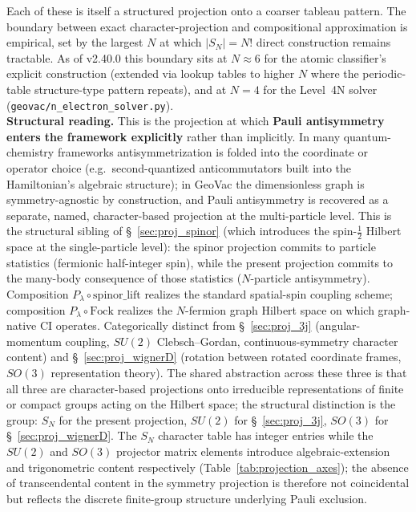 \documentclass[11pt]{article}
\begin{document}
Each of these is itself a structured projection onto a coarser
tableau pattern.  The boundary between exact character-projection
and compositional approximation is empirical, set by the largest $N$
at which $|S_N| = N!$ direct construction remains tractable.  As of
v2.40.0 this boundary sits at $N \approx 6$ for the atomic
classifier's explicit construction (extended via lookup tables to
higher $N$ where the periodic-table structure-type pattern repeats),
and at $N = 4$ for the Level~4N solver
(\texttt{geovac/n\_electron\_solver.py}).\\
\textbf{Structural reading.}  This is the projection at which
\textbf{Pauli antisymmetry enters the framework explicitly} rather
than implicitly.  In many quantum-chemistry frameworks
antisymmetrization is folded into the coordinate or operator choice
(e.g.\ second-quantized anticommutators built into the Hamiltonian's
algebraic structure); in GeoVac the dimensionless graph is
symmetry-agnostic by construction, and
Pauli antisymmetry is recovered as a separate, named, character-based
projection at the multi-particle level.  This is the structural
sibling of \S~\ref{sec:proj_spinor} (which introduces the
spin-$\tfrac{1}{2}$ Hilbert space at the single-particle level): the
spinor projection commits to particle statistics (fermionic
half-integer spin), while the present projection commits to the
many-body consequence of those statistics ($N$-particle
antisymmetry).  Composition $P_\lambda \circ
\text{spinor\_lift}$ realizes the standard spatial-spin coupling
scheme; composition $P_\lambda \circ \text{Fock}$ realizes the
$N$-fermion graph Hilbert space on which graph-native CI operates.
Categorically distinct from \S~\ref{sec:proj_3j} (angular-momentum
coupling, $SU(2)$ Clebsch--Gordan, continuous-symmetry character
content) and \S~\ref{sec:proj_wignerD} (rotation between rotated
coordinate frames, $SO(3)$ representation theory).  The shared
abstraction across these three is that all three are character-based
projections onto irreducible representations of finite or compact
groups acting on the Hilbert space; the structural distinction is
the group: $S_N$ for the present projection, $SU(2)$ for
\S~\ref{sec:proj_3j}, $SO(3)$ for \S~\ref{sec:proj_wignerD}.  The
$S_N$ character table has integer entries while the $SU(2)$ and
$SO(3)$ projector matrix elements introduce algebraic-extension and
trigonometric content respectively
(Table~\ref{tab:projection_axes}); the absence of transcendental
content in the symmetry projection is therefore not coincidental
but reflects the discrete finite-group structure underlying Pauli
exclusion.
\end{document}
